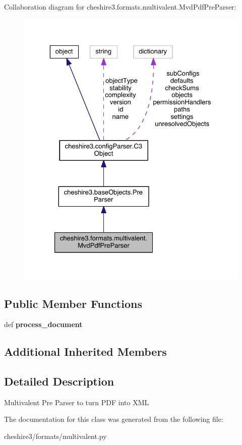 Collaboration diagram for cheshire3.\-formats.\-multivalent.\-Mvd\-Pdf\-Pre\-Parser\-:
\nopagebreak
\begin{figure}[H]
\begin{center}
\leavevmode
\includegraphics[width=325pt]{classcheshire3_1_1formats_1_1multivalent_1_1_mvd_pdf_pre_parser__coll__graph}
\end{center}
\end{figure}
\subsection*{Public Member Functions}
\begin{DoxyCompactItemize}
\item 
\hypertarget{classcheshire3_1_1formats_1_1multivalent_1_1_mvd_pdf_pre_parser_a9c1277d5085524a0fefa3d2fe1d59b79}{def {\bfseries process\-\_\-document}}\label{classcheshire3_1_1formats_1_1multivalent_1_1_mvd_pdf_pre_parser_a9c1277d5085524a0fefa3d2fe1d59b79}

\end{DoxyCompactItemize}
\subsection*{Additional Inherited Members}


\subsection{Detailed Description}
\begin{DoxyVerb}Multivalent Pre Parser to turn PDF into XML \end{DoxyVerb}
 

The documentation for this class was generated from the following file\-:\begin{DoxyCompactItemize}
\item 
cheshire3/formats/multivalent.\-py\end{DoxyCompactItemize}

